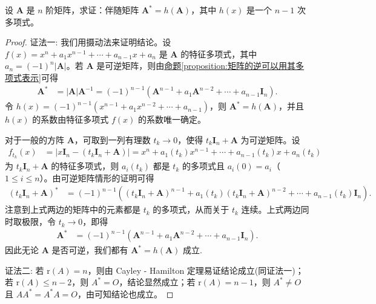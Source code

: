 \documentclass[../../main.tex]{subfiles}%
\begin{document}
\begin{proposition}\label{proposition:伴随矩阵可原矩阵的多项式表示}
设 \(\boldsymbol{A}\) 是 \(n\) 阶矩阵，求证：伴随矩阵 \(\boldsymbol{A}^* = h(\boldsymbol{A})\)，其中 \(h(x)\) 是一个 \(n - 1\) 次多项式。
\end{proposition}
\begin{proof}

{\color{blue}证法一:}
我们用摄动法来证明结论。设 \(f(x)=x^n + a_1x^{n - 1}+\cdots + a_{n - 1}x + a_n\) 是 \(\boldsymbol{A}\) 的特征多项式，其中 \(a_n = (-1)^n|\boldsymbol{A}|\)。若 \(\boldsymbol{A}\) 是可逆矩阵，则由\hyperref[proposition:矩阵的逆可以用其多项式表示]{命题\ref{proposition:矩阵的逆可以用其多项式表示}}可得
\begin{align*}
\boldsymbol{A}^*&=|\boldsymbol{A}|\boldsymbol{A}^{-1}=(-1)^{n - 1}(\boldsymbol{A}^{n - 1}+a_1\boldsymbol{A}^{n - 2}+\cdots + a_{n - 1}\boldsymbol{I}_n).
\end{align*}
令 \(h(x)=(-1)^{n - 1}(x^{n - 1}+a_1x^{n - 2}+\cdots + a_{n - 1})\)，则 \(\boldsymbol{A}^* = h(\boldsymbol{A})\)，并且 \(h(x)\) 的系数由特征多项式 \(f(x)\) 的系数唯一确定。

对于一般的方阵 \(\boldsymbol{A}\)，可取到一列有理数 \(t_k\rightarrow 0\)，使得 \(t_k\boldsymbol{I}_n+\boldsymbol{A}\) 为可逆矩阵。设
\begin{align*}
f_{t_k}(x)&=|x\boldsymbol{I}_n-(t_k\boldsymbol{I}_n+\boldsymbol{A})|=x^n + a_1(t_k)x^{n - 1}+\cdots + a_{n - 1}(t_k)x + a_n(t_k)
\end{align*}
为 \(t_k\boldsymbol{I}_n+\boldsymbol{A}\) 的特征多项式，则 \(a_i(t_k)\) 都是 \(t_k\) 的多项式且 \(a_i(0)=a_i\)（\(1\leqslant  i\leqslant  n\)）。由可逆矩阵情形的证明可得
\begin{align*}
(t_k\boldsymbol{I}_n+\boldsymbol{A})^*&=(-1)^{n - 1}\left((t_k\boldsymbol{I}_n+\boldsymbol{A})^{n - 1}+a_1(t_k)(t_k\boldsymbol{I}_n+\boldsymbol{A})^{n - 2}+\cdots + a_{n - 1}(t_k)\boldsymbol{I}_n\right).
\end{align*}
注意到上式两边的矩阵中的元素都是 \(t_k\) 的多项式，从而关于 \(t_k\) 连续。上式两边同时取极限，令 \(t_k\rightarrow 0\)，即得
\begin{align*}
\boldsymbol{A}^*&=(-1)^{n - 1}(\boldsymbol{A}^{n - 1}+a_1\boldsymbol{A}^{n - 2}+\cdots + a_{n - 1}\boldsymbol{I}_n).
\end{align*}
因此无论 \(\boldsymbol{A}\) 是否可逆，我们都有 \(\boldsymbol{A}^* = h(\boldsymbol{A})\) 成立.

{\color{blue}证法二:}
若 $\mathrm{r}(A)=n$，则由 Cayley - Hamilton 定理易证结论成立(同证法一)；若 $\mathrm{r}(A)\leqslant  n - 2$，则 $A^* = O$，结论显然成立；若 $\mathrm{r}(A)=n - 1$，则 $A^*\neq O$ 且 $AA^* = A^*A = O$，由可知结论也成立。

\end{proof}
\end{document}
